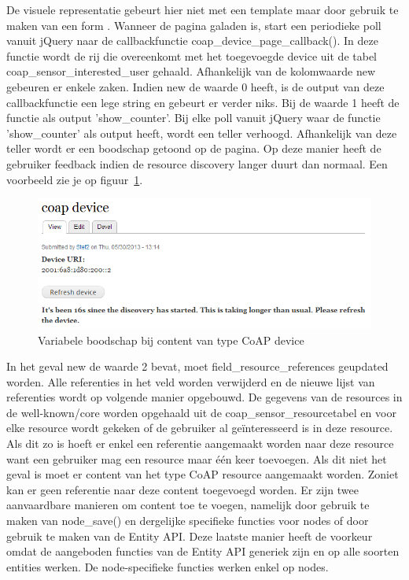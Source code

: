 De visuele representatie gebeurt hier niet met een template maar door gebruik te maken van een form \cite{formAPI}. Wanneer de pagina galaden is, start een periodieke poll vanuit jQuery naar de callbackfunctie coap\_device\_page\_callback(). In deze functie wordt de rij die overeenkomt met het toegevoegde device uit de tabel coap\_sensor\_interested\_user gehaald. Afhankelijk van de kolomwaarde new gebeuren er enkele zaken. Indien new de waarde 0 heeft, is de output van deze callbackfunctie een lege string en gebeurt er verder niks. Bij de waarde 1 heeft de functie als output 'show\_counter'. Bij elke poll vanuit jQuery waar de functie 'show\_counter' als output heeft, wordt een teller verhoogd. Afhankelijk van deze teller wordt er een boodschap getoond op de pagina. Op deze manier heeft de gebruiker feedback indien de resource discovery langer duurt dan normaal. Een voorbeeld zie je op figuur~\ref{fig:coapDeviceMessage}.
\begin{figure}[h!]
\centering
\includegraphics[width=1\textwidth]{fig/CoAPDeviceMessage}
\caption{Variabele boodschap bij content van type CoAP device}
\label{fig:coapDeviceMessage}
\end{figure}

\noindent
In het geval new de waarde 2 bevat, moet field\_resource\_references geupdated worden. Alle referenties in het veld worden verwijderd en de nieuwe lijst van referenties wordt op volgende manier opgebouwd. De gegevens van de resources in de well-known/core worden opgehaald uit de coap\_sensor\_resourcetabel en voor elke resource wordt gekeken of de gebruiker al ge\"{i}nteresseerd is in deze resource. Als dit zo is hoeft er enkel een referentie aangemaakt worden naar deze resource want een gebruiker mag een resource maar \'{e}\'{e}n keer toevoegen. Als dit niet het geval is moet er content van het type CoAP resource aangemaakt worden. Zoniet kan er geen referentie naar deze content toegevoegd worden. Er zijn twee aanvaardbare manieren om content toe te voegen, namelijk door gebruik te maken van node\_save() en dergelijke specifieke functies voor nodes of door gebruik te maken van de Entity API. Deze laatste manier heeft de voorkeur omdat de aangeboden functies van de Entity API generiek zijn en op alle soorten entities werken. De node-specifieke functies werken enkel op nodes.\\

